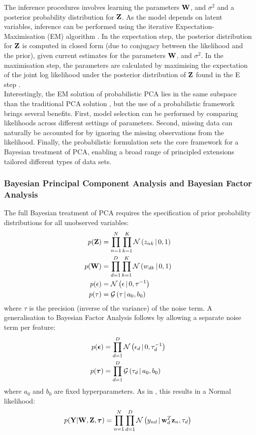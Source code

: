 The inference procedures involves learning the parameters ${\bf W}$, and $\sigma^2$ and a posterior probability distribution for ${\bf Z}$. As the model depends on latent variables, inference can be performed using the iterative Expectation-Maximisation (EM) algorithm \cite{Rubin1982,Bishop}. In the expectation step, the posterior distribution for ${\bf Z}$ is computed in closed form (due to conjugacy between the likelihood and the prior), given current estimates for the parameters ${\bf W}$, and $\sigma^2$. In the maximisation step, the parameters are calculated by maximising the expectation of the joint log likelihood under the posterior distribution of ${\bf Z}$ found in the E step \cite{Tipping1999}.\\
Interestingly, the EM solution of probabilistic PCA lies in the same subspace than the traditional PCA solution \cite{Tipping1999}, but the use of a probabilistic framework brings several benefits. First, model selection can be performed by comparing likelihoods across different settings of parameters. Second, missing data can naturally be accounted for by ignoring the missing observations from the likelihood. Finally, the probabilistic formulation sets the core framework for a Bayesian treatment of PCA, enabling a broad range of principled extensions tailored different types of data sets.


\subsubsection{Bayesian Principal Component Analysis and Bayesian Factor Analysis} \label{section:bayesian_pca}

The full Bayesian treatment of PCA requires the specification of prior probability distributions for all unobserved variables:
\begin{align*}
	p({\bf Z}) &= \prod_{n=1}^{N} \prod_{k=1}^{K} \mathcal{N}\left(z_{nk} \,|\, 0,1\right) \\
	p({\bf W}) &= \prod_{d=1}^{D} \prod_{k=1}^{K} \mathcal{N}\left(w_{dk} \,|\, 0,1\right) \\
	p(\epsilon) &= \mathcal{N}\left(\epsilon \,|\, 0,\tau^{-1}\right) \\
	p(\tau) &= \mathcal{G}\left(\tau \,|\, a_0,b_0\right)
\end{align*}
where $\tau$ is the precision (inverse of the variance) of the noise term. A generalisation to Bayesian Factor Analysis follows by allowing a separate noise term per feature:
\begin{align*}
	p(\mbox{\boldmath $\epsilon$}) &= \prod_{d=1}^{D} \mathcal{N}\left(\epsilon_d \,|\, 0,\tau_d^{-1}\right) \\
	p(\mbox{\boldmath $\tau$}) &= \prod_{d=1}^{D} \mathcal{G}\left(\tau_d \,|\, a_0,b_0\right)
\end{align*}
where $a_0$ and $b_0$ are fixed hyperparameters. As in , this results in a Normal likelihood:
\[
	p({\bf Y}|{\bf W},{\bf Z},\mbox{\boldmath $\tau$}) = \prod_{n=1}^{N} \prod_{d=1}^{D} \mathcal{N}\left(y_{nd} \,|\, {\bf w}_{d}^T {\bf z}_{n},\tau_d\right)
\]

